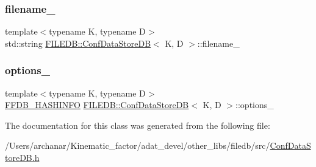 \subsubsection{\texorpdfstring{filename\_}{filename\_}}
{\footnotesize\ttfamily template$<$typename K, typename D$>$ \\
std\+::string \mbox{\hyperlink{classFILEDB_1_1ConfDataStoreDB}{F\+I\+L\+E\+D\+B\+::\+Conf\+Data\+Store\+DB}}$<$ K, D $>$\+::filename\+\_\+\hspace{0.3cm}{\ttfamily [protected]}}

\mbox{\label{classFILEDB_1_1ConfDataStoreDB_a0969c71741392e7f0a151226e05fada2}} 
\subsubsection{\texorpdfstring{options\_}{options\_}}
{\footnotesize\ttfamily template$<$typename K, typename D$>$ \\
\mbox{\hyperlink{structFFDB__HASHINFO}{F\+F\+D\+B\+\_\+\+H\+A\+S\+H\+I\+N\+FO}} \mbox{\hyperlink{classFILEDB_1_1ConfDataStoreDB}{F\+I\+L\+E\+D\+B\+::\+Conf\+Data\+Store\+DB}}$<$ K, D $>$\+::options\+\_\+\hspace{0.3cm}{\ttfamily [protected]}}



The documentation for this class was generated from the following file\+:\begin{DoxyCompactItemize}
\item 
/\+Users/archanar/\+Kinematic\+\_\+factor/adat\+\_\+devel/other\+\_\+libs/filedb/src/\mbox{\hyperlink{other__libs_2filedb_2src_2ConfDataStoreDB_8h}{Conf\+Data\+Store\+D\+B.\+h}}\end{DoxyCompactItemize}
